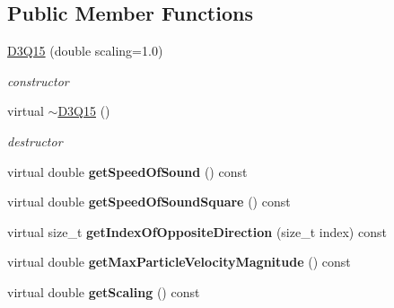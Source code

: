 \subsection*{Public Member Functions}
\begin{DoxyCompactItemize}
\item 
\hypertarget{classnatrium_1_1D3Q15_a3480ccd3d2dd501b9182e707585343e4}{
\hyperlink{classnatrium_1_1D3Q15_a3480ccd3d2dd501b9182e707585343e4}{D3Q15} (double scaling=1.0)}
\label{classnatrium_1_1D3Q15_a3480ccd3d2dd501b9182e707585343e4}

\begin{DoxyCompactList}\small\item\em constructor \item\end{DoxyCompactList}\item 
\hypertarget{classnatrium_1_1D3Q15_ac1209aada488649e7143dd1a3c3a48bd}{
virtual \hyperlink{classnatrium_1_1D3Q15_ac1209aada488649e7143dd1a3c3a48bd}{$\sim$D3Q15} ()}
\label{classnatrium_1_1D3Q15_ac1209aada488649e7143dd1a3c3a48bd}

\begin{DoxyCompactList}\small\item\em destructor \item\end{DoxyCompactList}\item 
\hypertarget{classnatrium_1_1D3Q15_aa5cefe71dadf4d4a70c37869b32e9083}{
virtual double {\bfseries getSpeedOfSound} () const }
\label{classnatrium_1_1D3Q15_aa5cefe71dadf4d4a70c37869b32e9083}

\item 
\hypertarget{classnatrium_1_1D3Q15_a848c6daea635a6734e1214fc1a8042d2}{
virtual double {\bfseries getSpeedOfSoundSquare} () const }
\label{classnatrium_1_1D3Q15_a848c6daea635a6734e1214fc1a8042d2}

\item 
\hypertarget{classnatrium_1_1D3Q15_a80ecf6e4e06ffacc8e81ab10de5c7ad2}{
virtual size\_\-t {\bfseries getIndexOfOppositeDirection} (size\_\-t index) const }
\label{classnatrium_1_1D3Q15_a80ecf6e4e06ffacc8e81ab10de5c7ad2}

\item 
\hypertarget{classnatrium_1_1D3Q15_ab57a74cd4e2ab90a35c444b46b5ef6a8}{
virtual double {\bfseries getMaxParticleVelocityMagnitude} () const }
\label{classnatrium_1_1D3Q15_ab57a74cd4e2ab90a35c444b46b5ef6a8}

\item 
\hypertarget{classnatrium_1_1D3Q15_a4a986aef907ced636fad465e3711745b}{
virtual double {\bfseries getScaling} () const }
\label{classnatrium_1_1D3Q15_a4a986aef907ced636fad465e3711745b}

\end{DoxyCompactItemize}
